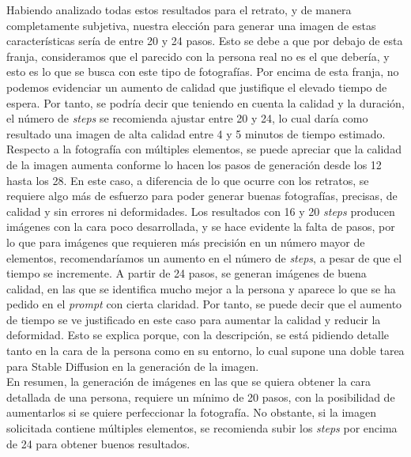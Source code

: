 Habiendo analizado todas estos resultados para el retrato, y de manera completamente subjetiva, nuestra elección para generar una imagen de estas características sería de entre 20 y 24 pasos. Esto se debe a que por debajo de esta franja, consideramos que el parecido con la persona real no es el que debería, y esto es lo que se busca con este tipo de fotografías. Por encima de esta franja, no podemos evidenciar un aumento de calidad que justifique el elevado tiempo de espera. Por tanto, se podría decir que teniendo en cuenta la calidad y la duración, el número de \textit{steps} se recomienda ajustar entre 20 y 24, lo cual daría como resultado una imagen de alta calidad entre 4 y 5 minutos de tiempo estimado.\\

Respecto a la fotografía con múltiples elementos, se puede apreciar que la calidad de la imagen aumenta conforme lo hacen los pasos de generación desde los 12 hasta los 28. En este caso, a diferencia de lo que ocurre con los retratos, se requiere algo más de esfuerzo para poder generar buenas fotografías, precisas, de calidad y sin errores ni deformidades. Los resultados con 16 y 20 \textit{steps} producen imágenes con la cara poco desarrollada, y se hace evidente la falta de pasos, por lo que para imágenes que requieren más precisión en un número mayor de elementos, recomendaríamos un aumento en el número de \textit{steps}, a pesar de que el tiempo se incremente. A partir de 24 pasos, se generan imágenes de buena calidad, en las que se identifica mucho mejor a la persona y aparece lo que se ha pedido en el \textit{prompt} con cierta claridad. Por tanto, se puede decir que el aumento de tiempo se ve justificado en este caso para aumentar la calidad y reducir la deformidad. Esto se explica porque, con la descripción, se está pidiendo detalle tanto en la cara de la persona como en su entorno, lo cual supone una doble tarea para Stable Diffusion en la generación de la imagen. \\


En resumen, la generación de imágenes en las que se quiera obtener la cara detallada de una persona, requiere un mínimo de 20 pasos, con la posibilidad de aumentarlos si se quiere perfeccionar la fotografía. No obstante, si la imagen solicitada contiene múltiples elementos, se recomienda subir los \textit{steps} por encima de 24 para obtener buenos resultados.

